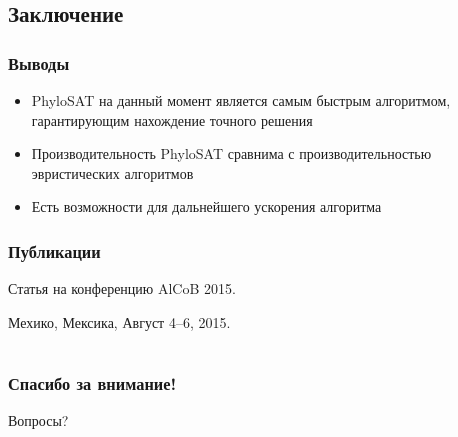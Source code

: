 \documentclass[hyperref={unicode}]{beamer}
\begin{document}
\subsection{Заключение}

\begin{frame}
\frametitle{Выводы}

\begin{itemize}
	\item PhyloSAT на данный момент является самым быстрым алгоритмом, гарантирующим нахождение точного решения
	\item Производительность PhyloSAT сравнима с производительностью эвристических алгоритмов
	\item Есть возможности для дальнейшего ускорения алгоритма
\end{itemize}

\end{frame}

\begin{frame}
\frametitle{Публикации}

Статья на конференцию AlCoB 2015.

Мехико, Мексика, Август 4--6, 2015.

\end{frame}

\section{}

\begin{frame}
\frametitle{Спасибо за внимание!}

Вопросы?
\end{frame}
\end{document}
